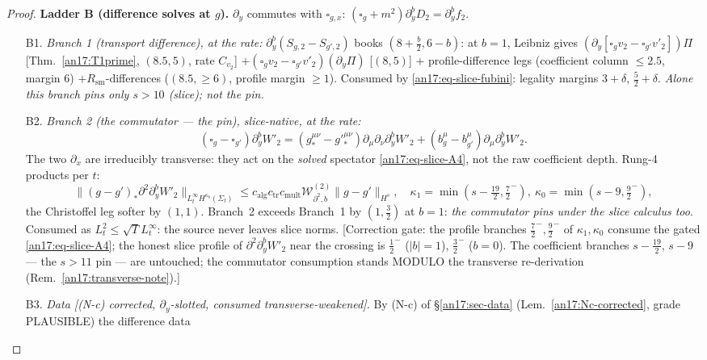 \begin{proof}
\medskip\noindent
\textbf{Ladder B (difference solves at $g$).} $\partial_y$ commutes with
$\square_{g,x}$: $(\square_g+m^2)\partial_y^bD_2=\partial_y^bf_2$.
\begin{itemize}
\item[B1.] \emph{Branch 1 (transport difference), at the rate:}
  $\partial_y^b(S_{g,2}-S_{g',2})$ books $(8+\tfrac b2,6-b)$: at $b=1$, Leibniz
  gives $(\partial_y[\square_gv_2-\square_{g'}v'_2])\Pi$
  [Thm.~\ref{an17:T1prime}, $(8.5,5)$, rate $C_{v_2}$]
  $+(\square_gv_2-\square_{g'}v'_2)(\partial_y\Pi)$ [$(8,5)$]
  $+$ profile-difference legs (coefficient column $\le2.5$, margin $6$)
  $+R_{\mathrm{sm}}$-differences ($(8.5,\ge6)$, profile margin $\ge1$).
  Consumed by \eqref{an17:eq-slice-fubini}: legality margins $3+\delta$,
  $\tfrac52+\delta$. \emph{Alone this branch pins only $s>10$ (slice); not the
  pin.}
\item[B2.] \emph{Branch 2 (the commutator --- the pin), slice-native, at the
  rate:}
  \[
   (\square_g-\square_{g'})\partial_y^bW'_2
   =(g_*^{\mu\nu}-g'^{\mu\nu}_*)\partial_\mu\partial_\nu\partial_y^bW'_2
   +(b_g^\mu-b_{g'}^\mu)\partial_\mu\partial_y^bW'_2 .
  \]
  The two $\partial_x$ are irreducibly transverse: they act on the \emph{solved}
  spectator \eqref{an17:eq-slice-A4}, not the raw coefficient depth. Rung-4
  products per $t$:
  \[
   \|(g-g')_*\partial^2\partial_y^bW'_2\|_{L^\infty_t H^{\kappa_b}(\Sigma_t)}
   \le c_{\mathrm{alg}}c_{\mathrm{tr}}c_{\mathrm{mult}}
   \mathcal W^{(2)}_{\partial^2,b}\|g-g'\|_{H^s},\quad
   \kappa_1=\min(s-\tfrac{19}2,\tfrac72^-),\
   \kappa_0=\min(s-9,\tfrac92^-),
  \]
  the Christoffel leg softer by $(1,1)$. Branch~2 exceeds Branch~1 by
  $(1,\tfrac32)$ at $b=1$: \emph{the commutator pins under the slice calculus
  too}. Consumed as $L^2_t\le\sqrt T L^\infty_t$: the source never leaves slice
  norms. \textup{[Correction gate: the profile branches $\tfrac72^-,\tfrac92^-$ of
  $\kappa_1,\kappa_0$ consume the gated \eqref{an17:eq-slice-A4}; the honest
  slice profile of $\partial^2\partial_y^bW'_2$ near the crossing is
  $\tfrac12^-$ ($|b|{=}1$), $\tfrac32^-$ ($b{=}0$). The coefficient branches
  $s-\tfrac{19}2$, $s-9$ --- the $s>11$ pin --- are untouched; the commutator
  consumption stands MODULO the transverse re-derivation
  (Rem.~\ref{an17:transverse-note}).]}
\item[B3.] \emph{Data \textup{[(N-c) corrected, $\partial_y$-slotted, consumed
  transverse-weakened]}.} By \textup{(N-c)} of \S\ref{an17:sec-data}
  (Lem.~\ref{an17:Nc-corrected}, grade PLAUSIBLE) the difference data

\end{itemize}
\end{proof}

